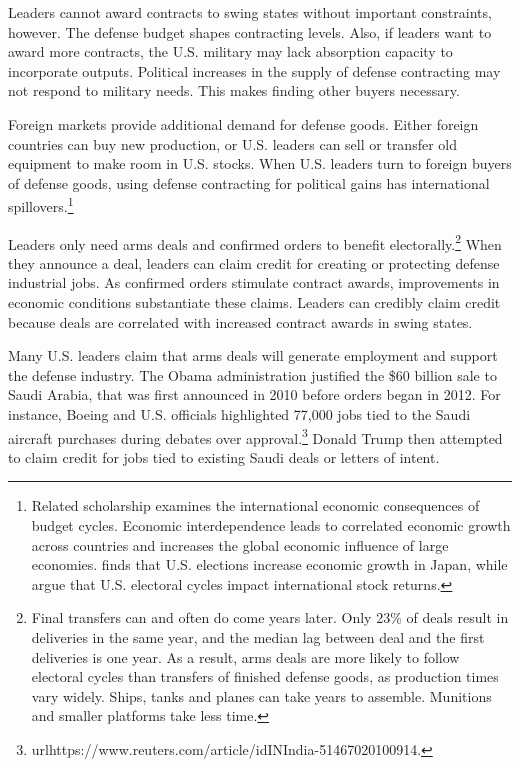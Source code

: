 \documentclass[12pt]{article}
\begin{document}
Leaders cannot award contracts to swing states without important constraints, however. 
The defense budget shapes contracting levels. 
Also, if leaders want to award more contracts, the U.S. military may lack absorption capacity to incorporate outputs.
Political increases in the supply of defense contracting may not respond to military needs.
This makes finding other buyers necessary.


Foreign markets provide additional demand for defense goods.
Either foreign countries can buy new production, or U.S. leaders can sell or transfer old equipment to make room in U.S. stocks. 
When U.S. leaders turn to foreign buyers of defense goods, using defense contracting for political gains has international spillovers.\footnote{%
Related scholarship examines the international economic consequences of budget cycles.
Economic interdependence leads to correlated economic growth across countries \citep{Kayser2006} and increases the global economic influence of large economies. 
\citet{Ito1991} finds that U.S. elections increase economic growth in Japan, while \citet{FoersterSchmitz1997} argue that U.S. electoral cycles impact international stock returns.
}


Leaders only need arms deals and confirmed orders to benefit electorally.\footnote{Final transfers can and often do come years later. 
Only 23\% of deals result in deliveries in the same year, and the median lag between deal and the first deliveries is one year. 
As a result, arms deals are more likely to follow electoral cycles than transfers of finished defense goods, as production times vary widely. 
Ships, tanks and planes can take years to assemble.
Munitions and smaller platforms take less time.}
When they announce a deal, leaders can claim credit for creating or protecting defense industrial jobs. 
As confirmed orders stimulate contract awards, improvements in economic conditions substantiate these claims. 
Leaders can credibly claim credit because deals are correlated with increased contract awards in swing states. 


Many U.S. leaders claim that arms deals will generate employment and support the defense industry. 
The Obama administration justified the \$60 billion sale to Saudi Arabia, that was first announced in 2010 before orders began in 2012.
For instance, Boeing and U.S. officials highlighted 77,000 jobs tied to the Saudi aircraft purchases during debates over approval.\footnote{url{https://www.reuters.com/article/idINIndia-51467020100914}.}
Donald Trump then attempted to claim credit for jobs tied to existing Saudi deals or letters of intent. 
\end{document}
